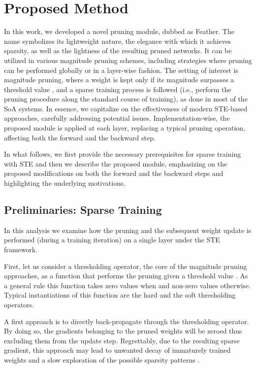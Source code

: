 \documentclass{article}
\begin{document}
\section{Proposed Method}

In this work, we developed a novel pruning module, dubbed as Feather. The name symbolizes its lightweight nature, the elegance with which it achieves sparsity, as well as the lightness of the resulting pruned networks. It can be utilized in various  magnitude pruning schemes,  including strategies where pruning can be performed globally or in a layer-wise fashion.
The setting of interest is magnitude pruning, where a weight is kept only if its magnitude surpasses a threshold value , 
and a sparse training process is followed (i.e., perform the pruning procedure along the standard course of training), as done in most of the SoA systems. 
In essence, we capitalize on the effectiveness of modern STE-based approaches, carefully addressing potential issues. 
Implementation-wise, the proposed module is applied at each layer, replacing a typical pruning operation, affecting both the forward and the backward step. 

In what follows, we first provide the necessary prerequisites for sparse training with STE and then we describe the proposed module, emphasizing on the proposed modifications on both the forward and the backward steps and highlighting the underlying motivations.


\subsection{Preliminaries: Sparse Training}

In this analysis we examine how the pruning and the subsequent weight update is performed (during a training iteration) on a single layer under the STE framework.

First, let us consider a thresholding operator, the core of the magnitude pruning approaches, as a function   that performs the pruning given a threshold value . As a general rule this function takes zero values when  and non-zero values otherwise. Typical instantiations of this function are the hard and the soft thresholding operators.

A first approach is to directly back-propagate through the thresholding operator. 
By doing so, the gradients belonging to the pruned weights will be zeroed thus excluding them from the update step. Regrettably, due to the resulting sparse gradient, this approach may lead to unwanted decay of immaturely trained weights and a slow exploration of the possible sparsity patterns \cite{jayakumar2020top, tai2022spartan}.
\end{document}
